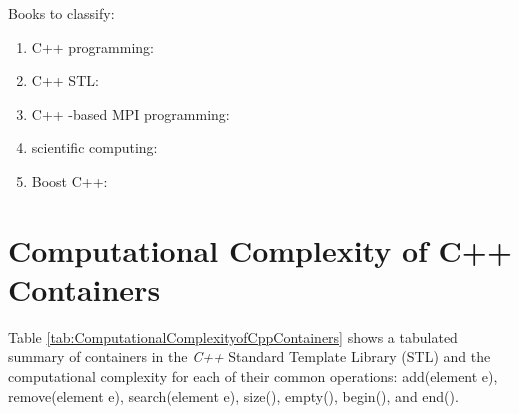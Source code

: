 Books to classify: \vspace{-0.3cm}
\begin{enumerate} \itemsep -4pt
\item C++ programming: \cite{Horstmann2012,Katupitiya2006,Koenig2000,Pozrikidis2007,Prata2005,Romanik2003,Savitch2009,Scheinerman2006,Schildt1998a,Schildt2003a}
\item C++ STL: \cite{Josuttis2012,Karlsson2006a,Robson2000,HewlettPackardCompanyStaff2014,HewlettPackardCompanyStaff1994,Riesbeck2009,Cline2000,Cline2003,Cline2011}
\item C++ -based MPI programming: \cite{Karniadakis2003}
\item scientific computing: \cite{PittFrancis2012}
\item Boost C++: \cite{Mukherjee2015,Polukhin2013,Schaling2012}
\end{enumerate}


\section{Computational Complexity of C++ Containers}
\label{sec:ComputationalComplexityofCppContainers}


Table \ref{tab:ComputationalComplexityofCppContainers} shows a tabulated summary of containers in the {\it C++} Standard Template Library (STL) and the computational complexity for each of their common operations: add(element e), remove(element e), search(element e), size(), empty(), begin(), and end(). \\

